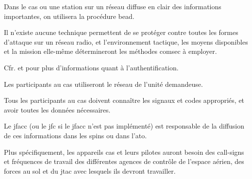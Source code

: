 \begin{e1}
{\begin{e2}
{				Dans le cas ou une station sur un réseau diffuse en clair des informations importantes, on utilisera la procédure \gls{bead}.
			}
			
		\end{e2}
		
		Il n'existe aucune technique permettent de se protéger contre toutes les formes d'attaque sur un réseau radio, et l'environnement tactique, les moyens disponibles et la mission elle-même détermineront les méthodes \gls{comsec} à employer.
		
		Cfr.   et  pour plus d'informations quant à l'authentification.
		

	}
	
	
	\begin{e2}
		
		\item Les participants au \gls{cas} utiliseront le réseau de l'unité demandeuse.
		
		\item Tous les participants au \gls{cas} doivent connaître les signaux et codes appropriés, et avoir toutes les données nécessaires.
		
		Le \gls{jfacc} (ou le \gls{jfc} si le \gls{jfacc} n'est pas implémenté) est responsable de la diffusion de ces informations dans les \gls{spins} ou dans l'\gls{ato}.
		
		\item Plus spécifiquement, les appareils \gls{cas} et leurs pilotes auront besoin des call-signs et fréquences de travail des différentes agences de contrôle de l'espace aérien, des forces au sol et du \gls{jtac} avec lesquels ils devront travailler.
	\end{e2}
	
	

\end{e1}
